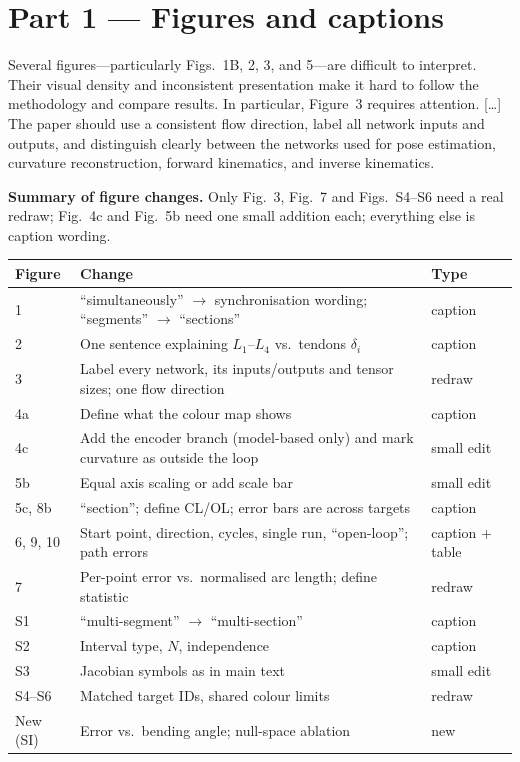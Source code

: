 \documentclass[10pt,a4paper]{article}
\begin{document}
\part*{Part 1 --- Figures and captions}
\label{sec:figs}
\setcounter{section}{1}\setcounter{subsection}{0}
\renewcommand{\thesubsection}{1.\arabic{subsection}}

\begin{rev}
Several figures---particularly Figs.~1B, 2, 3, and 5---are difficult to interpret. Their visual density and inconsistent presentation make it hard to follow the methodology and compare results. In particular, Figure~3 requires attention. [\dots] The paper should use a consistent flow direction, label all network inputs and outputs, and distinguish clearly between the networks used for pose estimation, curvature reconstruction, forward kinematics, and inverse kinematics.
\end{rev}

\textbf{Summary of figure changes.} Only Fig.~3, Fig.~7 and Figs.~S4--S6 need a real redraw; Fig.~4c and Fig.~5b need one small addition each; everything else is caption wording.

\small
\begin{tabularx}{\linewidth}{lXl}
\toprule
Figure & Change & Type\\\midrule
1 & ``simultaneously'' $\rightarrow$ synchronisation wording; ``segments'' $\rightarrow$ ``sections'' & caption\\
2 & One sentence explaining $L_1$--$L_4$ vs.\ tendons $\delta_i$ & caption\\
3 & Label every network, its inputs/outputs and tensor sizes; one flow direction & redraw\\
4a & Define what the colour map shows & caption\\
4c & Add the encoder branch (model-based only) and mark curvature as outside the loop & small edit\\
5b & Equal axis scaling or add scale bar & small edit\\
5c, 8b & ``section''; define CL/OL; error bars are across targets & caption\\
6, 9, 10 & Start point, direction, cycles, single run, ``open-loop''; path errors & caption + table\\
7 & Per-point error vs.\ normalised arc length; define statistic & redraw\\
S1 & ``multi-segment'' $\rightarrow$ ``multi-section'' & caption\\
S2 & Interval type, $N$, independence & caption\\
S3 & Jacobian symbols as in main text & small edit\\
S4--S6 & Matched target IDs, shared colour limits & redraw\\
New (SI) & Error vs.\ bending angle; null-space ablation & new\\
\bottomrule
\end{tabularx}
\normalsize
\end{document}
